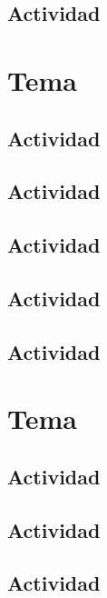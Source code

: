 \documentclass[12pt,examen]{repaso_layout}
\begin{document}
\begin{questions}
    \subsection{Actividad}
        \section{Tema}
    \subsection{Actividad}
    \subsection{Actividad}
    \subsection{Actividad}
    \subsection{Actividad}
    \subsection{Actividad}
        \section{Tema}
    \subsection{Actividad}
    \subsection{Actividad}
    \subsection{Actividad}

\end{questions}
\end{document}

